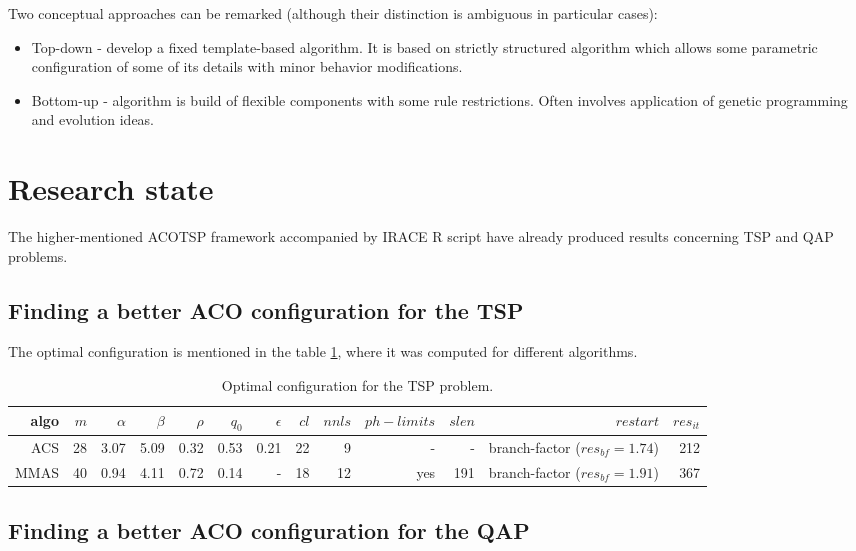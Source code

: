 \documentclass[12pt]{article}
\begin{document}
Two conceptual approaches can be remarked (although their distinction is ambiguous in particular cases):
\begin{itemize}
\item Top-down - develop a fixed template-based algorithm. It is based on strictly structured algorithm which allows some parametric configuration of some of its details with minor behavior modifications.
\item Bottom-up - algorithm is build of flexible components with some rule restrictions. Often involves application of genetic programming and evolution ideas.
\end{itemize}

\section{Research state}

The higher-mentioned ACOTSP framework accompanied by IRACE R script have already produced results concerning TSP and QAP problems.

\subsection{Finding a better ACO configuration for the TSP}

The optimal configuration is mentioned in the table \ref{table:table-tsp}, where it was computed for different algorithms.

\begin{table}[ht]
\centering
\resizebox{\textwidth}{!}
{
\begin{tabular}{|r|r|r|r|r|r|r|r|r|r|r|r|r|}
  \hline 
    algo & $m$ & $\alpha$ & $\beta$ & $\rho$ & $q_0$ & $\epsilon$ & $cl$ & $nnls$ & $ph-limits$ & $slen$ & $restart$ & $res_{it}$\\ \hline
    ACS & 28 & 3.07 & 5.09 & 0.32 & 0.53 & 0.21 & 22 & 9 & - & - & branch-factor ($res_{bf} = 1.74$) & 212\\ \hline
	MMAS & 40 & 0.94 & 4.11 & 0.72 & 0.14 & - & 18 & 12 & yes & 191 & branch-factor ($res_{bf} = 1.91$) & 367\\ \hline
    
\end{tabular}
}
\caption{Optimal configuration for the TSP problem.}
\label{table:table-tsp} 
\end{table} 

\subsection{Finding a better ACO configuration for the QAP}
\end{document}
